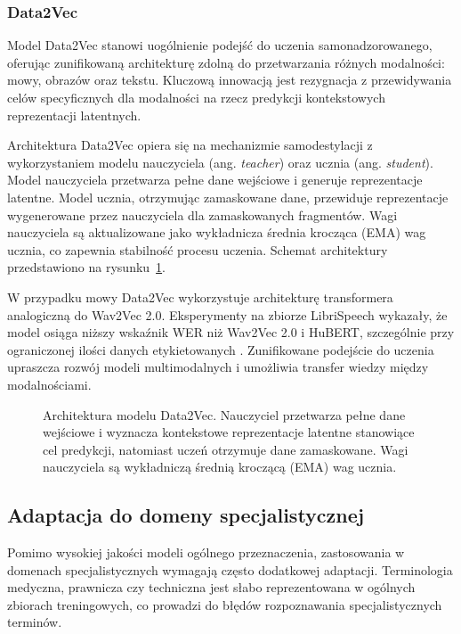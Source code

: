 \subsubsection{Data2Vec}

Model Data2Vec \cite{data2vec} stanowi uogólnienie podejść do uczenia samonadzorowanego, oferując zunifikowaną architekturę zdolną do przetwarzania różnych modalności: mowy, obrazów oraz tekstu. Kluczową innowacją jest rezygnacja z przewidywania celów specyficznych dla modalności na rzecz predykcji kontekstowych reprezentacji latentnych.

Architektura Data2Vec opiera się na mechanizmie samodestylacji z wykorzystaniem modelu nauczyciela (ang. \textit{teacher}) oraz ucznia (ang. \textit{student}). Model nauczyciela przetwarza pełne dane wejściowe i generuje reprezentacje latentne. Model ucznia, otrzymując zamaskowane dane, przewiduje reprezentacje wygenerowane przez nauczyciela dla zamaskowanych fragmentów. Wagi nauczyciela są aktualizowane jako wykładnicza średnia krocząca (EMA) wag ucznia, co zapewnia stabilność procesu uczenia. Schemat architektury przedstawiono na rysunku~\ref{fig:data2vecArchitecture}.

W przypadku mowy Data2Vec wykorzystuje architekturę transformera analogiczną do Wav2Vec 2.0. Eksperymenty na zbiorze LibriSpeech wykazały, że model osiąga niższy wskaźnik WER niż Wav2Vec 2.0 i HuBERT, szczególnie przy ograniczonej ilości danych etykietowanych \cite{data2vec}. Zunifikowane podejście do uczenia upraszcza rozwój modeli multimodalnych i umożliwia transfer wiedzy między modalnościami.

\begin{figure}[htbp]
    \centering
    \caption{Architektura modelu Data2Vec. Nauczyciel przetwarza pełne dane wejściowe i wyznacza kontekstowe reprezentacje latentne stanowiące cel predykcji, natomiast uczeń otrzymuje dane zamaskowane. Wagi nauczyciela są wykładniczą średnią kroczącą (EMA) wag ucznia.}
    \label{fig:data2vecArchitecture}
\end{figure}

\subsection{Adaptacja do domeny specjalistycznej}

Pomimo wysokiej jakości modeli ogólnego przeznaczenia, zastosowania w domenach specjalistycznych wymagają często dodatkowej adaptacji. Terminologia medyczna, prawnicza czy techniczna jest słabo reprezentowana w ogólnych zbiorach treningowych, co prowadzi do błędów rozpoznawania specjalistycznych terminów.

